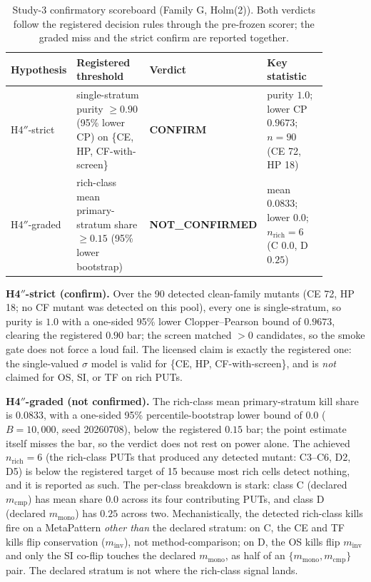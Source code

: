 \documentclass[manuscript,screen,review]{acmart}
\begin{document}
\begin{table}[t]
\caption{Study-3 confirmatory scoreboard (Family G, Holm(2)). Both verdicts
follow the registered decision rules through the pre-frozen scorer; the graded
miss and the strict confirm are reported together.}
\label{tab:study3-scoreboard}
\centering
\small
\begin{tabular}{p{0.13\linewidth}p{0.31\linewidth}p{0.16\linewidth}p{0.28\linewidth}}
\toprule
Hypothesis & Registered threshold & Verdict & Key statistic \\
\midrule
H4\('' \)-strict & single-stratum purity \(\geq 0.90\) (95\% lower CP) on
\{CE, HP, CF-with-screen\} & \textbf{CONFIRM} & purity \(1.0\); lower CP
\(0.9673\); \(n = 90\) (CE 72, HP 18) \\
H4\('' \)-graded & rich-class mean primary-stratum share \(\geq 0.15\) (95\%
lower bootstrap) & \textbf{NOT\_CONFIRMED} & mean \(0.0833\); lower \(0.0\);
\(n_{\mathrm{rich}} = 6\) (C \(0.0\), D \(0.25\)) \\
\bottomrule
\end{tabular}
\normalsize
\end{table}

\textbf{H4\('' \)-strict (confirm).} Over the 90 detected clean-family mutants
(CE 72, HP 18; no CF mutant was detected on this pool), every one is
single-stratum, so purity is \(1.0\) with a one-sided 95\% lower
Clopper--Pearson bound of \(0.9673\), clearing the registered \(0.90\) bar; the
screen matched \(>0\) candidates, so the smoke gate does not force a loud fail.
The licensed claim is exactly the registered one: the single-valued \(\sigma\)
model is valid for \{CE, HP, CF-with-screen\}, and is \emph{not} claimed for
OS, SI, or TF on rich PUTs.

\textbf{H4\('' \)-graded (not confirmed).} The rich-class mean primary-stratum
kill share is \(0.0833\), with a one-sided 95\% percentile-bootstrap lower bound
of \(0.0\) (\(B = 10{,}000\), seed 20260708), below the registered \(0.15\) bar;
the point estimate itself misses the bar, so the verdict does not rest on power
alone. The achieved \(n_{\mathrm{rich}} = 6\) (the rich-class PUTs that produced
any detected mutant: C3--C6, D2, D5) is below the registered target of 15
because most rich cells detect nothing, and it is reported as such. The
per-class breakdown is stark: class C (declared \(m_{\mathrm{cmp}}\)) has mean
share \(0.0\) across its four contributing PUTs, and class D (declared
\(m_{\mathrm{mono}}\)) has \(0.25\) across two. Mechanistically, the detected
rich-class kills fire on a MetaPattern \emph{other than} the declared stratum:
on C, the CE and TF kills flip conservation (\(m_{\mathrm{inv}}\)), not
method-comparison; on D, the OS kills flip \(m_{\mathrm{inv}}\) and only the SI
co-flip touches the declared \(m_{\mathrm{mono}}\), as half of an
\(\{m_{\mathrm{mono}}, m_{\mathrm{cmp}}\}\) pair. The declared stratum is not
where the rich-class signal lands.
\end{document}
